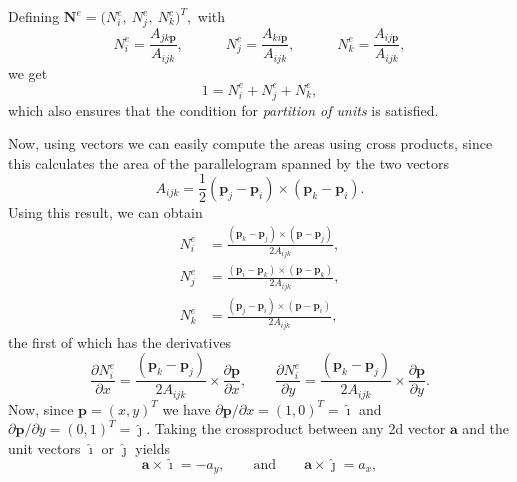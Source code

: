 \documentclass[acmtog]{acmart}
\begin{document}
Defining $\boldsymbol N^e = \big(N_i^e, \ N_j^e, \ N_k^e\big)^T,$ with
%
\begin{equation}
  N_i^e = \frac{A_{jk \boldsymbol p}}{A_{ijk}}, \qquad\quad N_j^e = \frac{A_{ki \boldsymbol p}}{A_{ijk}}, \qquad\quad N_k^e = \frac{A_{ij \boldsymbol p}}{A_{ijk}},
\end{equation}
%
we get
%
\begin{equation}
  1 = N_i^e + N_j^e + N_k^e,
\end{equation}
%
which also ensures that the condition for \textit{partition of units}  is satisfied.

Now, using vectors we can easily compute the areas using cross products, since this calculates the area of the parallelogram spanned by the two vectors
%
\begin{equation}
  A_{ijk} = \frac{1}{2} (\boldsymbol p_j - \boldsymbol p_i) \times (\boldsymbol p_k - \boldsymbol p_i).
\end{equation}
%
Using this result, we can obtain
%
\begin{align}
  N_i^e & = \frac{(\boldsymbol p_k - \boldsymbol p_j) \times (\boldsymbol p - \boldsymbol p_j)}{2 A_{ijk}}, \\
  N_j^e & = \frac{(\boldsymbol p_i - \boldsymbol p_k) \times (\boldsymbol p - \boldsymbol p_k)}{2 A_{ijk}}, \\
  N_k^e & = \frac{(\boldsymbol p_j - \boldsymbol p_i) \times (\boldsymbol p - \boldsymbol p_i)}{2 A_{ijk}},
\end{align}
%
the first of which has the derivatives
%
\begin{equation}
  \frac{ \partial N_i^e }{ \partial x } = \frac{(\boldsymbol p_k - \boldsymbol p_j)}{2 A_{ijk}} \times \frac{ \partial \boldsymbol p }{ \partial x }, \qquad \frac{ \partial N_i^e }{ \partial y } = \frac{(\boldsymbol p_k - \boldsymbol p_j)}{2 A_{ijk}} \times \frac{ \partial \boldsymbol p }{ \partial y }.
\end{equation}
%
Now, since $\boldsymbol p = (x, y)^T$ we have $\partial \boldsymbol p/\partial x = (1, 0)^T = \boldsymbol{\hat{\imath}}$ and $\partial \boldsymbol p/\partial y = (0, 1)^T = \boldsymbol{\hat{\jmath}}$. Taking the crossproduct between any 2d vector $\boldsymbol a$ and the unit vectors $\boldsymbol{\hat{\imath}}$ or $\boldsymbol{\hat{\jmath}}$ yields
%
\begin{equation}
  \boldsymbol a \times \boldsymbol{\hat{\imath}} = -a_y, \qquad \text{and}\qquad \boldsymbol a \times \boldsymbol{\hat{\jmath}} = a_x,
\end{equation}
\end{document}
